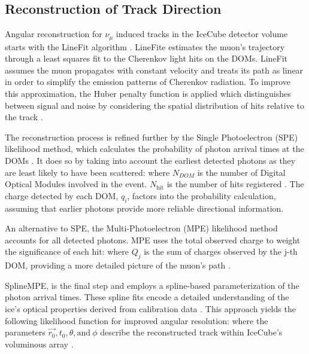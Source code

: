 \subsection{Reconstruction of Track Direction}

Angular reconstruction for $\nu_\mu$ induced tracks in the IceCube detector volume starts with the LineFit algorithm \cite{AMANDA_trackreco}.
LineFite estimates the muon's trajectory through a least squares fit to the Cherenkov light hits on the DOMs.
LineFit assumes the muon propagates with constant velocity and treats its path as linear in order to simplify the emission patterns of Cherenkov radiation.
To improve this approximation, the Huber penalty function \cite{Huber:1964} is applied which distinguishes between signal and noise by considering the spatial distribution of hits relative to the track \cite{IC3_Calibration}.

The reconstruction process is refined further by the Single Photoelectron (SPE) likelihood method, which calculates the probability of photon arrival times at the DOMs \cite{Huber:1964}.
It does so by taking into account the earliest detected photons as they are least likely to have been scattered:
\spe
where $N_{DOM}$ is the number of Digital Optical Modules involved in the event.
$N_{\mathrm{hit}}$ is the number of hits registered \cite{AMANDA_trackreco}.
The charge detected by each DOM, $q_i$, factors into the probability calculation, assuming that earlier photons provide more reliable directional information.

An alternative to SPE, the Multi-Photoelectron (MPE) likelihood method accounts for all detected photons.
MPE uses the total observed charge to weight the significance of each hit:
\mpe
where $Q_j$ is the sum of charges observed by the j-th DOM, providing a more detailed picture of the muon's path \cite{AMANDA_trackreco}.

SplineMPE, is the final step and employs a spline-based parameterization of the photon arrival times.
These spline fits encode a detailed understanding of the ice's optical properties derived from calibration data \cite{AMANDA_trackreco}.
This approach yields the following likelihood function for improved angular resolution:
\splineMPE
where the parameters $\vec{r_0}, t_0, \theta, \mathrm{ and}~\phi$ describe the reconstructed track within IceCube's voluminous array \cite{AMANDA_trackreco}.

